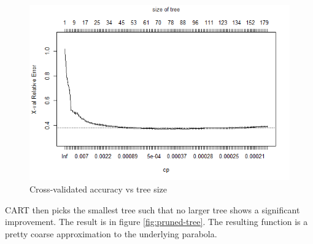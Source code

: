\documentclass[10pt,openany]{article}
\numberwithin{definition}{section}
\numberwithin{example}{section}
\numberwithin{equation}{section}
\numberwithin{figure}{section}
\begin{document}
\begin{figure}
\noindent \begin{centering}
\includegraphics[width=12cm]{fig/rpart-unpruned-plotcp}
\par\end{centering}

\protect\caption{\label{fig:Cross-validated-accuracy-vs}Cross-validated accuracy vs
tree size}
\end{figure}


CART then picks the smallest tree such that no larger tree shows a
significant improvement. The result is in figure \ref{fig:pruned-tree}.
The resulting function is a pretty coarse approximation to the underlying
parabola.
\end{document}
